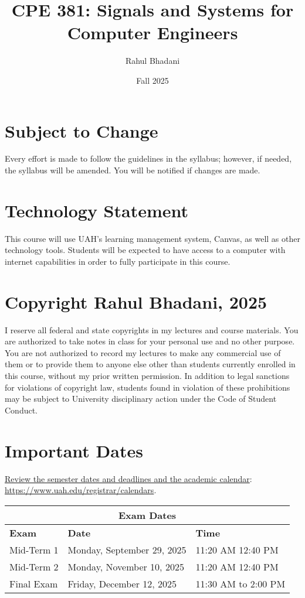 \documentclass[12pt,nohyper,nobib,xcolor=dvipsnames,svgnames,x11names]{tufte-book}
\title{CPE 381: Signals and Systems for Computer Engineers}
\date{Fall 2025}
\author[Rahul Bhadani]{Rahul Bhadani}
\begin{document}
\maketitle

\newpage

\section*{Subject to Change}
Every effort is made to follow the guidelines in the syllabus; however, if needed, the syllabus will be amended. You will be notified if changes are made.

\section*{Technology Statement}
This course will use UAH’s learning management system, Canvas, as well as other technology tools. Students will be expected to have access to a computer with internet capabilities in order to fully participate in this course. 



\section{Copyright Rahul Bhadani, 2025}

I reserve all federal and state copyrights in my lectures and course materials. You are authorized to take notes in class for your personal use and no other purpose. You are not authorized to record my lectures to make any commercial use of them or to provide them to anyone else other than students currently enrolled in this course, without my prior written permission. In addition to legal sanctions for violations of copyright law, students found in violation of these prohibitions may be subject to University disciplinary action under the Code of Student Conduct.

\section*{Important Dates}
\href{https://www.uah.edu/registrar/calendars}{Review the semester dates and deadlines and the academic calendar}: \url{https://www.uah.edu/registrar/calendars}.

\vspace{15pt}

\begin{tabular}{|p{3cm}|p{5cm}|p{5cm}|}
\hline
\multicolumn{3}{|c|}{\textbf{Exam Dates}} \\ \hline
\textbf{Exam} & \textbf{Date} & \textbf{Time} \\ \hline
Mid-Term 1 & Monday, September 29, 2025 & 11:20 AM 12:40 PM\\ \hline
Mid-Term 2 & Monday, November 10, 2025 & 11:20 AM 12:40 PM\\ \hline
Final Exam & Friday, December 12, 2025 & 11:30 AM to 2:00 PM\\ \hline
\end{tabular}
\end{document}
